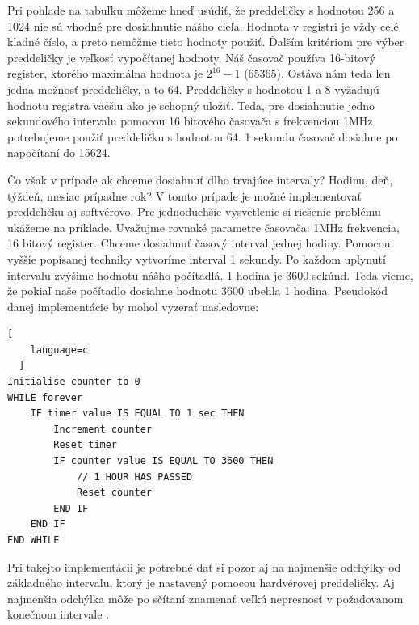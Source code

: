 Pri pohľade na tabuľku môžeme hneď usúdiť, že preddeličky s hodnotou 256 a 1024 nie sú vhodné pre dosiahnutie nášho cieľa. Hodnota v registri je vždy celé kladné číslo, a preto nemôžme tieto hodnoty použiť. Ďalším kritériom pre výber preddeličky je veľkosť
vypočítanej hodnoty. Náš časovač používa 16-bitový register, ktorého maximálna hodnota je $2^{16} -1$ (65365).
Ostáva nám teda len jedna možnosť preddeličky, a to 64. Preddeličky s hodnotou 1 a 8 vyžadujú hodnotu registra väčšiu ako je schopný uložiť.
Teda, pre dosiahnutie jedno sekundového intervalu pomocou 16 bitového časovača s frekvenciou 1MHz potrebujeme použiť preddeličku s hodnotou 64.
1 sekundu časovač dosiahne po napočítaní do 15624. \par
Čo však v prípade ak chceme dosiahnuť dlho trvajúce intervaly? Hodinu, deň, týždeň, mesiac prípadne rok?
V tomto prípade je možné implementovať preddeličku aj softvérovo. Pre jednoduchšie vysvetlenie si riešenie problému ukážeme na príklade. Uvažujme rovnaké parametre časovača: 1MHz frekvencia, 16 bitový register. Chceme dosiahnuť časový interval jednej hodiny. Pomocou vyššie popísanej techniky vytvoríme interval 1 sekundy.
Po každom uplynutí intervalu zvýšime hodnotu nášho počítadlá. 1 hodina je 3600 sekúnd. Teda vieme, že pokiaľ naše počítadlo dosiahne hodnotu 3600 ubehla 1 hodina.
Pseudokód danej implementácie by mohol vyzerať nasledovne:
\begin{lstlisting}[
    language=c
  ]  
Initialise counter to 0
WHILE forever
    IF timer value IS EQUAL TO 1 sec THEN
        Increment counter
        Reset timer
        IF counter value IS EQUAL TO 3600 THEN
            // 1 HOUR HAS PASSED
            Reset counter
        END IF
    END IF
END WHILE
\end{lstlisting}
Pri takejto implementácii je potrebné dať si pozor aj na najmenšie odchýlky od základného intervalu, ktorý je nastavený pomocou hardvérovej preddeličky.
Aj najmenšia odchýlka môže po sčítaní znamenať veľkú nepresnosť v požadovanom konečnom intervale \cite{cameraNewbieGuideAVR2015}.

